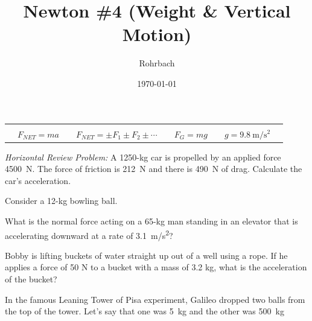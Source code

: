 \documentclass[10pt]{exam}
\title{Newton \#4 (Weight \& Vertical Motion)}
\author{Rohrbach}
\date{\today}
\newcommand{\printeqs}{
  \begin{center}
    \begin{tabular}{|*9c|}
      \hline 
      &&&&&&&&\\
      &
      $F_{NET}=ma$ &&
      $F_{NET}=\pm F_1 \pm F_2 \pm \cdots$ &&
      $F_G=mg$ &&
      $g=\SI{9.8}{\meter\per\second^2}$ &
      \\
      \hline
    \end{tabular}
  \end{center}
}
\begin{document}
\maketitle

\printeqs

\begin{questions}

\question \emph{Horizontal Review Problem:} A 1250-kg car is propelled by an applied force 4500~N. The force of friction is 212~N and there is 490~N of drag.  Calculate the car's acceleration.
\vs[2]

\question
  Consider a 12-kg bowling ball.


\question
  What is the normal force acting on a 65-kg man standing in an elevator that is accelerating downward at a rate of \SI{3.1}{m/s^2}?
  \vs[3]

\pagebreak
\question
  Bobby is lifting buckets of water straight up out of a well using a rope.  If he applies a force of 50 N to a bucket with a mass of 3.2 kg, what is the acceleration of the bucket?
  \vs[3]
  
\question
  In the famous Leaning Tower of Pisa experiment, Galileo dropped two balls from the top of the tower.  Let's say that one was 5~kg and the other was 500~kg



\end{questions}
\end{document}
